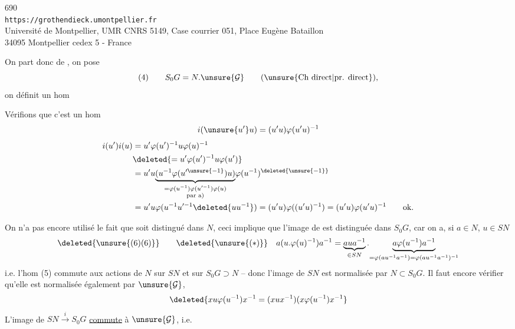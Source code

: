 
\begin{center}
690\\
\texttt{https://grothendieck.umontpellier.fr}\\
Université de Montpellier, UMR CNRS 5149, Case courrier 051, Place Eugène Bataillon\\
34095 Montpellier cedex 5 - France
\end{center}



On part donc de , on pose
\[
 (4)\qquad S_0G=N.\unsure{\mathcal G}\qquad(\text{\unsure{Ch direct|pr. direct}}),
\]
on définit un hom


Vérifions que c'est un hom
\[
 i(\unsure{u'}u)=(u'u)\varphi(u'u)^{-1}
\]
\[
\begin{aligned}
 i(u')i(u)&=u'\varphi(u')^{-1}u\varphi(u)^{-1}\\
 &\deleted{=u'\varphi(u')^{-1}u\varphi(u')}\\
 &=u'u\underset{\substack{=\varphi(u^{-1})\varphi(u'^{-1})\varphi(u)\\\text{par a)}}}{\underbrace{(u^{-1}\varphi(u'^{\unsure{-1}})u)}}\varphi(u^{-1})^{\deleted{\unsure{-1}}}\\
 &=u'u\varphi(u^{-1}u'^{-1}\deleted{uu^{-1}})=(u'u)\varphi((u'u)^{-1})=(u'u)\varphi(u'u)^{-1}\qquad\text{ok.}
\end{aligned}
\]

On n'a pas encore utilisé le fait que soit distingué dans $N$,  ceci implique que l'image de  est distinguée dans $S_0G$, car  on a, si $a\in N$, $u\in SN$
\[
 \deleted{\unsure{(6)(6)}}\qquad\deleted{\unsure{(*)}}\quad
 a(u.\varphi(u)^{-1})a^{-1}
 =\underbrace{aua^{-1}}_{\in SN}.\underset{=\varphi(au^{-1}a^{-1})=\varphi(au^{-1}a^{-1})^{-1}}{\underbrace{a\varphi(u^{-1})a^{-1}}}
\]
i.e. l'hom (5)  commute aux actions de $N$ sur $SN$ et sur $S_0G\supset N$ -- donc l'image de $SN$ est normalisée par $N\subset S_0G$. Il faut encore vérifier qu'elle est normalisée également par $\unsure{\mathcal G}$, 
\[
 \deleted{xu\varphi(u^{-1})x^{-1}=(xux^{-1})(x\varphi(u^{-1})x^{-1}}
\]
L'image de $SN\xrightarrow{i}S_0G$ \uline{commute} à $\unsure{\mathcal G}$, i.e.

